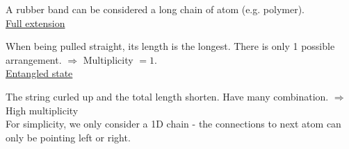 \documentclass[class=article, crop=false, 12pt]{standalone}
\begin{document}
A rubber band can be considered a long chain of atom (e.g. polymer).\\

\ul{Full extension}


When being pulled straight, 
its length is the longest.
There is only 1 possible arrangement. 
$\Rightarrow$ Multiplicity $=1$.\\


\ul{Entangled state}



The string curled up and the total length shorten.
Have many combination.
$\Rightarrow$ High multiplicity\\

For simplicity, we only consider a 1D chain - 
the connections to next atom can only be pointing left or right.

\end{document}
